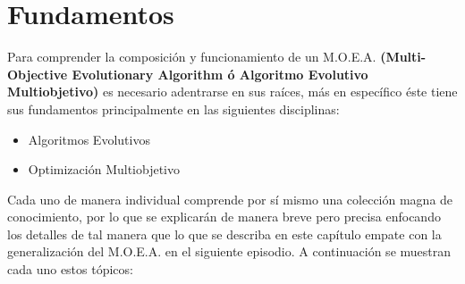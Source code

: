 \documentclass[class=report, crop=false]{standalone}
\begin{document}
\chapter{Fundamentos}
Para comprender la composición y funcionamiento de un M.O.E.A. 
\textbf{(Multi-Objective Evolutionary Algorithm ó Algoritmo 
Evolutivo Multiobjetivo)} es necesario adentrarse en sus raíces, 
más en específico éste tiene sus fundamentos principalmente en 
las siguientes disciplinas:

\begin{itemize}
\item Algoritmos Evolutivos
\item Optimización Multiobjetivo
\end{itemize}

Cada uno de manera individual comprende por sí mismo una colección 
magna de conocimiento, por lo que se explicarán de manera breve pero 
precisa enfocando los detalles de tal manera que lo que se describa 
en este capítulo empate con la generalización del M.O.E.A. en el 
siguiente episodio.\break
A continuación se muestran cada uno estos tópicos:

\end{document}
